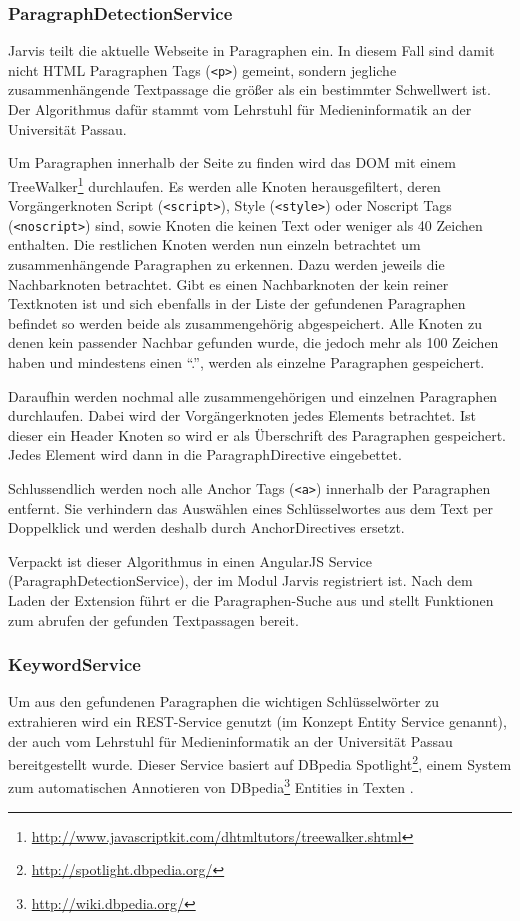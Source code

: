   \subsubsection{ParagraphDetectionService}
  Jarvis teilt die aktuelle Webseite in Paragraphen ein. In diesem Fall sind damit nicht HTML Paragraphen Tags (\texttt{<p>}) gemeint, sondern jegliche zusammenhängende Textpassage die größer als ein bestimmter Schwellwert ist. Der Algorithmus dafür stammt vom Lehrstuhl für Medieninformatik an der Universität Passau.
 
  Um Paragraphen innerhalb der Seite zu finden wird das DOM mit einem TreeWalker\footnote{\url{http://www.javascriptkit.com/dhtmltutors/treewalker.shtml}} durchlaufen. Es werden alle Knoten herausgefiltert, deren Vorgängerknoten Script (\texttt{<script>}), Style (\texttt{<style>}) oder Noscript Tags (\texttt{<noscript>}) sind, sowie Knoten die keinen Text oder weniger als 40 Zeichen enthalten. Die restlichen Knoten werden nun einzeln betrachtet um zusammenhängende Paragraphen zu erkennen. Dazu werden jeweils die Nachbarknoten betrachtet. Gibt es einen Nachbarknoten der kein reiner Textknoten ist und sich ebenfalls in der Liste der gefundenen Paragraphen befindet so werden beide als zusammengehörig abgespeichert. Alle Knoten zu denen kein passender Nachbar gefunden wurde, die jedoch mehr als 100 Zeichen haben und mindestens einen ``.'', werden als einzelne Paragraphen gespeichert.

  Daraufhin werden nochmal alle zusammengehörigen und einzelnen Paragraphen durchlaufen. Dabei wird der Vorgängerknoten jedes Elements betrachtet. Ist dieser ein Header Knoten so wird er als Überschrift des Paragraphen gespeichert. Jedes Element wird dann in die ParagraphDirective eingebettet.

  Schlussendlich werden noch alle Anchor Tags (\texttt{<a>}) innerhalb der Paragraphen entfernt. Sie verhindern das Auswählen eines Schlüsselwortes aus dem Text per Doppelklick und werden deshalb durch AnchorDirectives ersetzt. 

  Verpackt ist dieser Algorithmus in einen AngularJS Service (ParagraphDetectionService), der im Modul Jarvis registriert ist. Nach dem Laden der Extension führt er die Paragraphen-Suche aus und stellt Funktionen zum abrufen der gefunden Textpassagen bereit.
 
  \subsubsection{KeywordService}
  Um aus den gefundenen Paragraphen die wichtigen Schlüsselwörter zu extrahieren wird ein REST-Service genutzt (im Konzept Entity Service genannt), der auch vom Lehrstuhl für Medieninformatik an der Universität Passau bereitgestellt wurde. Dieser Service basiert auf DBpedia Spotlight\footnote{\url{http://spotlight.dbpedia.org/}}, einem System zum automatischen Annotieren von DBpedia\footnote{\url{http://wiki.dbpedia.org/}} Entities in Texten \cite{daiber2013improving}. 

